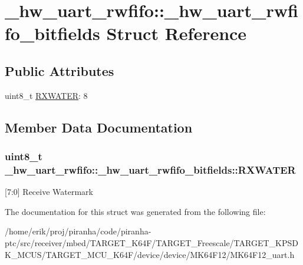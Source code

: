 \hypertarget{struct__hw__uart__rwfifo_1_1__hw__uart__rwfifo__bitfields}{}\section{\+\_\+hw\+\_\+uart\+\_\+rwfifo\+:\+:\+\_\+hw\+\_\+uart\+\_\+rwfifo\+\_\+bitfields Struct Reference}
\label{struct__hw__uart__rwfifo_1_1__hw__uart__rwfifo__bitfields}
\subsection*{Public Attributes}
\begin{DoxyCompactItemize}
\item 
uint8\+\_\+t \hyperlink{struct__hw__uart__rwfifo_1_1__hw__uart__rwfifo__bitfields_aeeb904ff5425fcccdb4130bfd608f402}{R\+X\+W\+A\+T\+ER}\+: 8
\end{DoxyCompactItemize}


\subsection{Member Data Documentation}
\subsubsection[{\texorpdfstring{R\+X\+W\+A\+T\+ER}{RXWATER}}]{\setlength{\rightskip}{0pt plus 5cm}uint8\+\_\+t \+\_\+hw\+\_\+uart\+\_\+rwfifo\+::\+\_\+hw\+\_\+uart\+\_\+rwfifo\+\_\+bitfields\+::\+R\+X\+W\+A\+T\+ER}\hypertarget{struct__hw__uart__rwfifo_1_1__hw__uart__rwfifo__bitfields_aeeb904ff5425fcccdb4130bfd608f402}{}\label{struct__hw__uart__rwfifo_1_1__hw__uart__rwfifo__bitfields_aeeb904ff5425fcccdb4130bfd608f402}
\mbox{[}7\+:0\mbox{]} Receive Watermark 

The documentation for this struct was generated from the following file\+:\begin{DoxyCompactItemize}
\item 
/home/erik/proj/piranha/code/piranha-\/ptc/src/receiver/mbed/\+T\+A\+R\+G\+E\+T\+\_\+\+K64\+F/\+T\+A\+R\+G\+E\+T\+\_\+\+Freescale/\+T\+A\+R\+G\+E\+T\+\_\+\+K\+P\+S\+D\+K\+\_\+\+M\+C\+U\+S/\+T\+A\+R\+G\+E\+T\+\_\+\+M\+C\+U\+\_\+\+K64\+F/device/device/\+M\+K64\+F12/M\+K64\+F12\+\_\+uart.\+h\end{DoxyCompactItemize}
